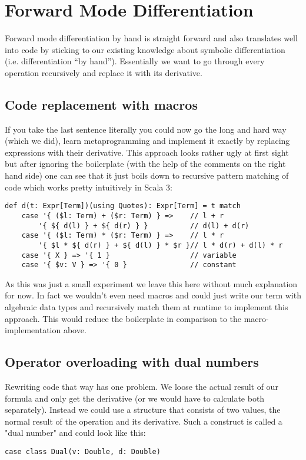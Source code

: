 \chapter{Forward Mode Differentiation} \label{sec:forwardMode}

Forward mode differentiation by hand is straight forward and also translates well into code by sticking to our existing knowledge about symbolic differentiation (i.e. differentiation ``by hand''). Essentially we want to go through every operation recursively and replace it with its derivative.


\section{Code replacement with macros} \label{sec:macros}
If you take the last sentence literally you could now go the long and hard way (which we did), learn metaprogramming and implement it exactly by replacing expressions with their derivative. This approach looks rather ugly at first sight but after ignoring the boilerplate (with the help of the comments on the right hand side) one can see that it just boils down to recursive pattern matching of code which works pretty intuitively in Scala 3:
\begin{lstlisting}
def d(t: Expr[Term])(using Quotes): Expr[Term] = t match
    case '{ ($l: Term) + ($r: Term) } =>    // l + r
        '{ ${ d(l) } + ${ d(r) } }          // d(l) + d(r)
    case '{ ($l: Term) * ($r: Term) } =>    // l * r
        '{ $l * ${ d(r) } + ${ d(l) } * $r }// l * d(r) + d(l) * r
    case '{ X } => '{ 1 }                   // variable
    case '{ $v: V } => '{ 0 }               // constant
\end{lstlisting}
As this was just a small experiment we leave this here without much explanation for now. In fact we wouldn't even need macros and could just write our term with algebraic data types and recursively match them at runtime to implement this approach. This would reduce the boilerplate in comparison to the macro-implementation above.


\section{Operator overloading with dual numbers}\label{sec:forwardDualNumbers}

Rewriting code that way has one problem. We loose the actual result of our formula and only get the derivative (or we would have to calculate both separately). Instead we could use a structure that consists of two values, the normal result of the operation and its derivative. Such a construct is called a "dual number" and could look like this:
\begin{lstlisting}
case class Dual(v: Double, d: Double)
\end{lstlisting}


